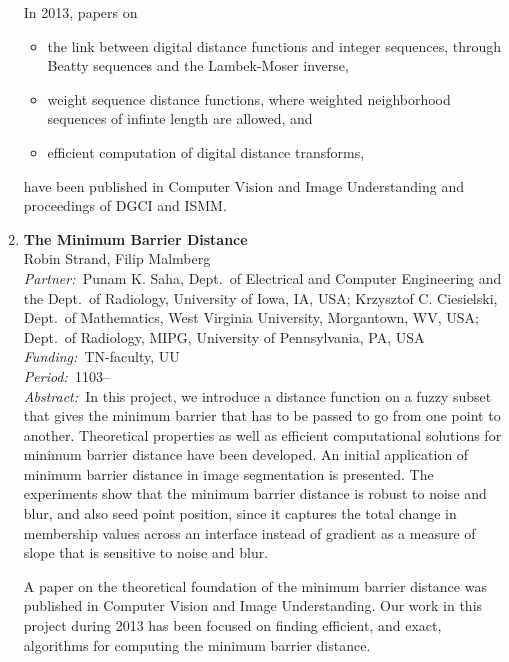 \documentclass[10pt, a4paper]{article}
\newcommand{\aabstract}[1]{\emph{Abstract:~}#1}
\newcommand{\ffunding}[1]{\emph{Funding:~}#1\\}
\newcommand{\ppartner}[1]{\emph{Partner:~}#1\\}
\newcommand{\pperiod}[1]{\emph{Period:~}#1\\}
\begin{document}
\begin{enumerate}
{In 2013, papers on 
\begin{itemize}
\item the link between digital distance functions and integer sequences, through Beatty sequences and the Lambek-Moser inverse,
\item weight sequence distance functions, where weighted neighborhood sequences of infinte length are allowed, and
\item efficient computation of digital distance transforms, 
\end{itemize}
have been published in Computer Vision and Image Understanding and proceedings of DGCI and ISMM.}


\item 
\label{proj:MBD}
\textbf{The Minimum Barrier Distance}\\
Robin Strand, Filip Malmberg\\
\ppartner{Punam K. Saha, Dept.~of Electrical and Computer Engineering and the Dept.~of Radiology, University of Iowa, IA, USA; Krzysztof C. Ciesielski, Dept.~of Mathematics, West Virginia University, Morgantown, WV, USA; Dept.~of Radiology, MIPG, University of Pennsylvania, PA, USA}
\ffunding{TN-faculty, UU}
\pperiod{1103--}
\aabstract{In this project, we introduce a distance function on a fuzzy subset that gives the minimum barrier that has to be passed to go from one point to another. Theoretical properties as well as efficient computational solutions for minimum barrier distance have been developed. An initial application of minimum barrier distance in image segmentation is presented. The experiments show that the minimum barrier distance is robust to noise and blur, and also seed point position, since it captures the total change in membership values across an interface instead of gradient as a measure of slope that is sensitive to noise and blur.

A paper on the theoretical foundation of the minimum barrier distance was published in Computer Vision and Image Understanding. Our work in this project during 2013 has been focused on finding efficient, and exact, algorithms for computing the minimum barrier distance.}



\end{enumerate}
\end{document}
